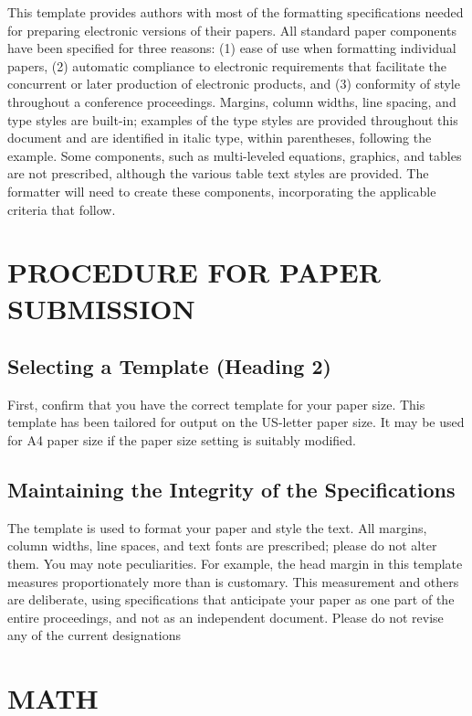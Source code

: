 \documentclass[letterpaper, 10 pt, conference]{ieeeconf}  %
\begin{document}
This template provides authors with most of the formatting specifications needed for preparing electronic versions of their papers. All standard paper components have been specified for three reasons: (1) ease of use when formatting individual papers, (2) automatic compliance to electronic requirements that facilitate the concurrent or later production of electronic products, and (3) conformity of style throughout a conference proceedings. Margins, column widths, line spacing, and type styles are built-in; examples of the type styles are provided throughout this document and are identified in italic type, within parentheses, following the example. Some components, such as multi-leveled equations, graphics, and tables are not prescribed, although the various table text styles are provided. The formatter will need to create these components, incorporating the applicable criteria that follow.

\section{PROCEDURE FOR PAPER SUBMISSION}

\subsection{Selecting a Template (Heading 2)}

First, confirm that you have the correct template for your paper size. This template has been tailored for output on the US-letter paper size. 
It may be used for A4 paper size if the paper size setting is suitably modified.

\subsection{Maintaining the Integrity of the Specifications}

The template is used to format your paper and style the text. All margins, column widths, line spaces, and text fonts are prescribed; please do not alter them. You may note peculiarities. For example, the head margin in this template measures proportionately more than is customary. This measurement and others are deliberate, using specifications that anticipate your paper as one part of the entire proceedings, and not as an independent document. Please do not revise any of the current designations

\section{MATH}
\end{document}
